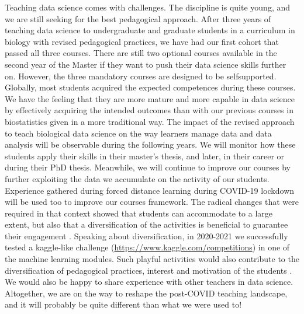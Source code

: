 \documentclass{aims}
\theoremstyle{definition}
\begin{document}
Teaching data science comes with challenges. The discipline is quite
young, and we are still seeking for the best pedagogical approach. After
three years of teaching data science to undergraduate and graduate
students in a curriculum in biology with revised pedagogical practices,
we have had our first cohort that passed all three courses. There are
still two optional courses available in the second year of the Master if
they want to push their data science skills further on. However, the
three mandatory courses are designed to be selfsupported. Globally, most
students acquired the expected competences during these courses. We have
the feeling that they are more mature and more capable in data science
by effectively acquiring the intended outcomes than with our previous
courses in biostatistics given in a more traditional way. The impact of
the revised approach to teach biological data science on the way
learners manage data and data analysis will be observable during the
following years. We will monitor how these students apply their skills
in their master's thesis, and later, in their career or during their PhD
thesis. Meanwhile, we will continue to improve our courses by further
exploiting the data we accumulate on the activity of our students.
Experience gathered during forced distance learning during COVID-19
lockdown will be used too to improve our courses framework. The radical
changes that were required in that context showed that students can
accommodate to a large extent, but also that a diversification of the
activities is beneficial to guarantee their engagement
\cite{Spadafora2018, Young2002}. Speaking about diversification, in
2020-2021 we successfully tested a kaggle-like challenge
(\url{https://www.kaggle.com/competitions}) in one of the machine
learning modules. Such playful activities would also contribute to the
diversification of pedagogical practices, interest and motivation of the
students \cite{Alonso2019}. We would also be happy to share experience
with other teachers in data science. Altogether, we are on the way to
reshape the post-COVID teaching landscape, and it will probably be quite
different than what we were used to!

\end{document}
